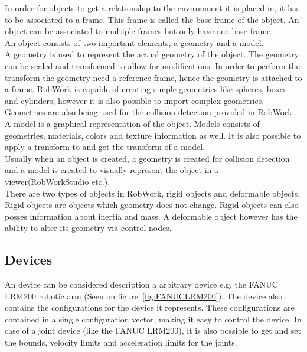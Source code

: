In order for objects to get a relationship to the environment it is placed in, it has to be associated to a frame. This frame is called the base frame of the object. An object can be associated to multiple frames but only have one base frame.\\

An object consists of two important elements, a geometry and a model.\\
A geometry is used to represent the actual geometry of the object. The geometry can be scaled and transformed to allow for modifications. In order to perform the transform the geometry need a reference frame, hence the geometry is attached to a frame. RobWork is capable of creating simple geometries like spheres, boxes and cylinders, however it is also possible to import complex geometries. Geometries are also being used for the collision detection provided in RobWork.\\
A model is a graphical representation of the object. Models consists of geometries, materials, colors and texture information as well. It is also possible to apply a transform to and get the transform of a model.\\
Usually when an object is created, a geometry is created for collision detection and a model is created to visually represent the object in a viewer(RobWorkStudio etc.).\\

There are two types of objects in RobWork, rigid objects and deformable objects. Rigid objects are objects which  geometry does not change. Rigid objects can also posses information about inertia and mass. A deformable object however has the ability to alter its geometry via control nodes.


\subsection{Devices}
An device can be considered description a arbitrary device e.g. the FANUC LRM200 robotic arm (Seen on figure~\ref{fig:FANUCLRM200}). The device also contains the configurations for the device it represents. These configurations are contained in a single configuration vector, making it easy to control the device. In case of a joint device (like the FANUC LRM200), it is also possible to get and set the bounds, velocity limits and acceleration limits for the joints.\\

